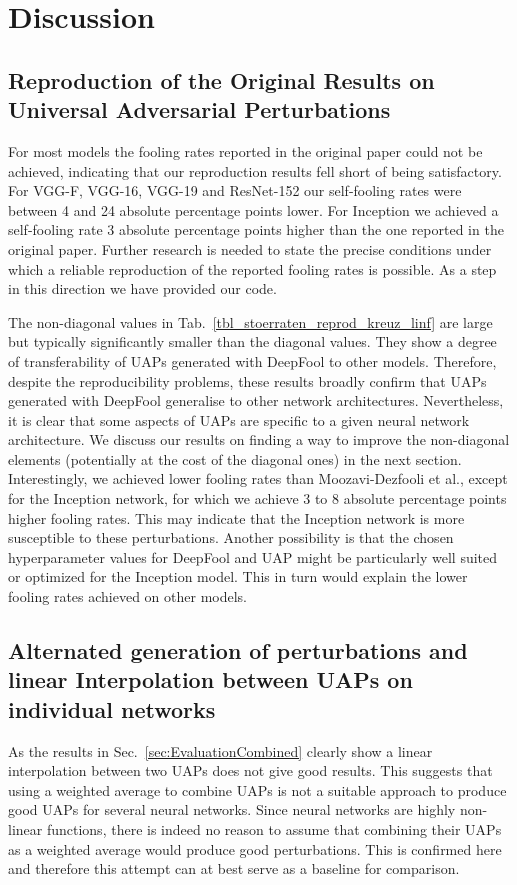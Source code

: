 \documentclass[runningheads]{llncs}
\begin{document}
\section{Discussion}\label{sec:Discussion}
\subsection{Reproduction of the Original Results on Universal Adversarial Perturbations}
For most models the fooling rates reported in the original paper could not be achieved, indicating that our reproduction results fell short of being satisfactory. For VGG-F, VGG-16, VGG-19 and ResNet-152 our self-fooling rates were between 4 and 24 absolute percentage points lower. For Inception we achieved a self-fooling rate 3 absolute percentage points higher than the one reported in the original paper. Further research is needed to state the precise conditions under which a reliable reproduction of the reported fooling rates is possible. As a step in this direction we have provided our code.

The non-diagonal values in Tab.~\ref{tbl_stoerraten_reprod_kreuz_linf} are large but typically significantly smaller than the diagonal values. They show a degree of transferability of UAPs generated with DeepFool to other models. Therefore, despite the reproducibility problems, these results broadly confirm that UAPs generated with DeepFool generalise to other network architectures. Nevertheless, it is clear that some aspects of UAPs are specific to a given neural network architecture. We discuss our results on finding a way to improve the non-diagonal elements (potentially at the cost of the diagonal ones) in the next section.
Interestingly, we achieved lower fooling rates than Moozavi-Dezfooli et al., except for the Inception network, for which we achieve 3 to 8 absolute percentage points higher fooling rates. This may indicate that the Inception network is more susceptible to these perturbations. Another possibility is that the chosen hyperparameter values for DeepFool and UAP might be particularly well suited or optimized for the Inception model. This in turn would explain the lower fooling rates achieved on other models.

\subsection{Alternated generation of perturbations and linear Interpolation be\-tween UAPs on individual networks}
As the results in Sec.~\ref{sec:EvaluationCombined} clearly show a linear interpolation between two UAPs does not give good results. This suggests that using a weighted average to combine UAPs is not a suitable approach to produce good UAPs for several neural networks. Since neural networks are highly non-linear functions, there is indeed no reason to assume that combining their UAPs as a weighted average would produce good perturbations. This is confirmed here and therefore this attempt can at best serve as a baseline for comparison. 
\end{document}

